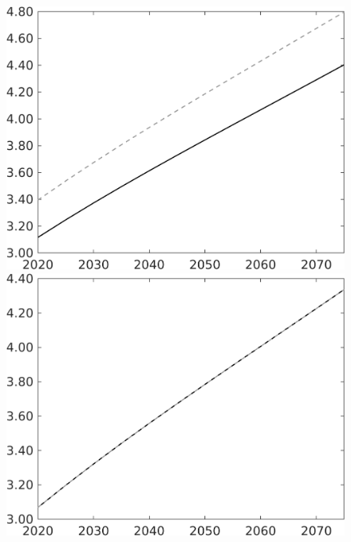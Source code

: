 \documentclass[12pt]{article}
\begin{document}
\begin{figure}[h!!]
\begin{minipage}[]{0.32\textwidth}
	\end{minipage}	
	\begin{minipage}[]{0.32\textwidth}
		\includegraphics[width=1\textwidth]{../../codding_model/own_basedOnFried/optimalPol_010922_revision/figures/all_13Sept22/CompTaul_Equlab_LFBAU_Reg0_Y_spillover0_nsk1_xgr1_knspil1_sep1_countec0_GovRev0_etaa0.79_lgd0.png}
	\end{minipage}	
	\begin{minipage}[]{0.32\textwidth}
		\includegraphics[width=1\textwidth]{../../codding_model/own_basedOnFried/optimalPol_010922_revision/figures/all_13Sept22/CompTaul_Equlab_LFBAU_Reg0_wh_spillover0_nsk1_xgr1_knspil1_sep1_countec0_GovRev0_etaa0.79_lgd0.png}

\end{minipage}
\end{figure}
\end{document}
